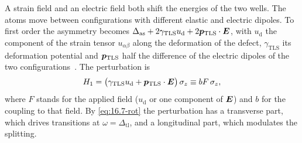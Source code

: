 A strain field and an electric field both shift the energies of the two wells. The atoms move between configurations with different elastic and electric dipoles. To first order the asymmetry becomes $\Delta_{\mathrm{as}} + 2\gamma_{\mathrm{TLS}}u_{\mathrm{d}} + 2\bm{p}_{\mathrm{TLS}}\cdot\bm{E}$, with $u_{\mathrm{d}}$ the component of the strain tensor $u_{\alpha\beta}$ along the deformation of the defect, $\gamma_{\mathrm{TLS}}$ its deformation potential and $\bm{p}_{\mathrm{TLS}}$ half the difference of the electric dipoles of the two configurations~\cite[Eq.~(16)]{muller2019towards}. The perturbation is
\begin{equation}
  H_1 = \bigl(\gamma_{\mathrm{TLS}}u_{\mathrm{d}} + \bm{p}_{\mathrm{TLS}}\cdot\bm{E}\bigr)\,\sigma_z \equiv bF\,\sigma_z ,
  \label{eq:16.7-H1}
\end{equation}
where $F$ stands for the applied field ($u_{\mathrm{d}}$ or one component of $\bm{E}$) and $b$ for the coupling to that field. By \cref{eq:16.7-rot} the perturbation has a transverse part, which drives transitions at $\omega = \Delta_{\mathrm{tl}}$, and a longitudinal part, which modulates the splitting.

